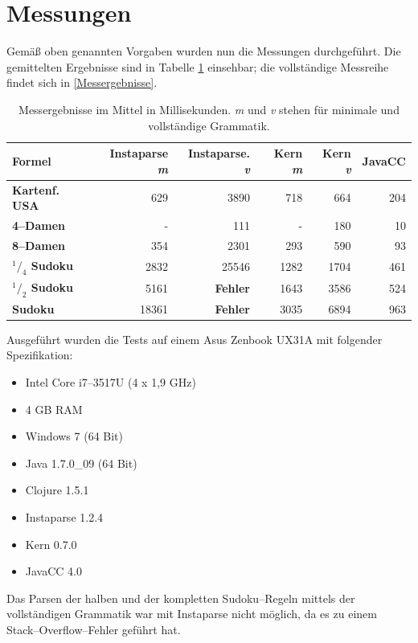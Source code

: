 \documentclass[ngerman,a4paper,abstracton,open=right,twoside=false,toc=listofnumbered,bibtotocnumbered]{scrreprt}
\begin{document}
\section{Messungen}

Gemäß oben genannten Vorgaben wurden nun die Messungen durchgeführt. Die gemittelten Ergebnisse sind in Tabelle \ref{messergebnisse-kurz} einsehbar; die vollständige Messreihe findet sich in \ref{Messergebnisse}.

\begin{table}[h]
	\begin{tabular}{|l|r|r|r|r|r|}
		\hline
		\textbf{Formel} & \textbf{Instaparse \emph{m}} & \textbf{Instaparse. \emph{v}} & \textbf{Kern \emph{m}} & \textbf{Kern \emph{v}} & \textbf{JavaCC} \\ \hline
		\textbf{Kartenf. USA} & 629 & 3890 & 718 & 664 & 204 \\ \hline
		\textbf{4--Damen} & - & 111 & - & 180 & 10 \\ \hline
		\textbf{8--Damen} & 354 & 2301 & 293 & 590 & 93 \\ \hline
		\textbf{$^1/_4$ Sudoku} & 2832 & 25546 & 1282 & 1704 & 461 \\ \hline
		\textbf{$^1/_2$ Sudoku} & 5161 & \textbf{Fehler} & 1643 & 3586 & 524 \\ \hline
		\textbf{Sudoku} & 18361 & \textbf{Fehler} & 3035 & 6894 & 963 \\ \hline 
	\end{tabular}
	\label{messergebnisse-kurz}
	\caption{Messergebnisse im Mittel in Millisekunden. \emph{m} und \emph{v} stehen für \glqq{}minimale\grqq{} und \glqq{}vollständige Grammatik\grqq.}
\end{table}

Ausgeführt wurden die Tests auf einem Asus Zenbook UX31A mit folgender Spezifikation:

\begin{itemize}
	\item Intel Core i7--3517U (4 x 1,9 GHz)
	\item 4 GB RAM
	\item Windows 7 (64 Bit)
	\item Java 1.7.0\_09 (64 Bit)
	\item Clojure 1.5.1
	\item Instaparse 1.2.4
	\item Kern 0.7.0
	\item JavaCC 4.0
\end{itemize}

Das Parsen der halben und der kompletten Sudoku--Regeln mittels der vollständigen Grammatik war mit Instaparse nicht möglich, da es zu einem Stack--Overflow--Fehler geführt hat.
\end{document}
